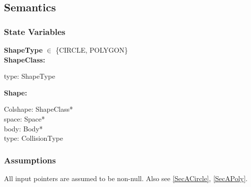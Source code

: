 \documentclass[12pt]{article}
\newcommand{\R}{$\mathbb{R}$}
\begin{document}
\subsection{Semantics}

\subsubsection{State Variables} \label{SecSVShape}
	\textbf{ShapeType} $\in$ \{CIRCLE, POLYGON\} \\
	\noindent 
	\noindent \textbf{ShapeClass:}
	\begin{multicols}{2}
		\noindent type: ShapeType \\
	\end{multicols}
	\noindent \textbf{Shape:}
	\begin{multicols}{2}
		\noindent Colshape: ShapeClass* \\
		space: Space* \\
		body: Body* \\
		type: CollisionType \\
	\end{multicols}
	

\subsubsection{Assumptions} \label{SecAShape}
	All input pointers are assumed to be non-null. Also see \ref{SecACircle}, \ref{SecAPoly}.
	
\end{document}
